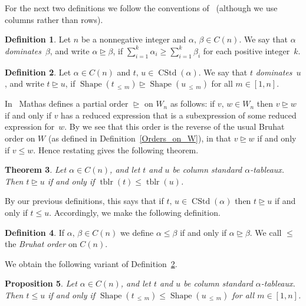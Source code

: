 \documentclass[10pt]{amsart}
\newtheorem{theo}{Theorem}[section]
\newtheorem{prop}[theo]{Proposition}
\theoremstyle{definition}
\newtheorem{defi}[theo]{Definition}
\DeclareMathOperator{\perm}{tblr}
\newcommand{\Lessthan}[2]{#1\,{_{\leqslant\,#2}}}
\DeclareMathOperator{\CSTD}{CStd}
\DeclareMathOperator{\shape}{Shape}
\begin{document}
For the next two definitions we follow the conventions of~\cite{math:heckeA}
(although we use columns rather than rows).

\begin{defi}\label{Dominance Order}
Let $n$ be a nonnegative integer and $\alpha,\,\beta \in C(n) $. We say that
$\alpha$ \emph{dominates}~$\beta$,
and write $\alpha \trianglerighteq \beta $, if $\sum_{i=1}^{k} \alpha_i \geqslant
\sum_{i=1}^{k} \beta_i$ for each positive integer~$k$.
\end{defi}

\begin{defi}\label{CSTD dominance}
Let $\alpha\in C(n)$ and $t,\,u\in\CSTD(\alpha)$. We say that
$t$ \emph{dominates}~$u$, and write $t\trianglerighteq u$, if
$\shape(\Lessthan tm)\trianglerighteq\shape(\Lessthan um)$ for all $m\in[1,n]$.
\end{defi}

In~\cite{math:heckeA} Mathas defines a partial order $\trianglerighteq$ on
$W_n$ as follows: if $v,\,w\in W_n$ then $v\trianglerighteq w$ if and
only if $v$ has a reduced expression that is a subexpression of some reduced expression
for~$w$. By \cite[Theorem~1.1]{deodhar:bruhat} we see that this order is
the reverse of the usual Bruhat order on $W$ (as defined in Definition~\ref{Orders_on_W}),
in that $v\trianglerighteq w$ if and only if $v\leqslant w$. Hence restating
\cite[Theorem~3.8]{math:heckeA} gives the following theorem.

\begin{theo}\label{equidombruhatold}
Let $\alpha\in C(n)$, and let $t$ and $u$ be column standard
$\alpha$-tableaux. Then $t\trianglerighteq u$ if and only if
$\perm(t) \leqslant \perm(u)$.
\end{theo}

By our previous definitions, this says that if $t,\,u\in\CSTD(\alpha)$
then $t\trianglerighteq u$ if and only if $t\leqslant u$. Accordingly,
we make the following definition.
\begin{defi}\label{BruhatforC(n)}
If $\alpha,\,\beta\in C(n)$ we define $\alpha\leqslant\beta$
if and only if $\alpha\trianglerighteq\beta$. We call $\leqslant$ the
\emph{Bruhat order} on $C(n)$.
\end{defi}
We obtain the following variant of Definition~\ref{CSTD dominance}.

\begin{prop}\label{equidombruhat}
Let $\alpha\in C(n)$, and let $t$ and $u$ be column standard
$\alpha$-tableaux. Then $t\leqslant u$ if and only if
$\shape(\Lessthan tm)\leqslant\shape(\Lessthan um)$ for all $m\in[1,n]$.
\end{prop}
\end{document}
